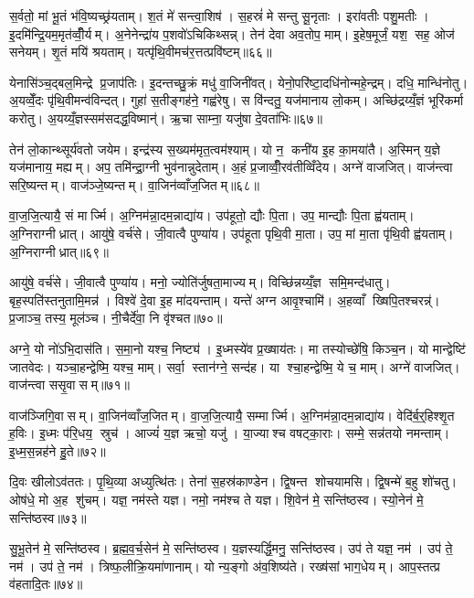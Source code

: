 स॒र्वतो॒ मां भू॒तं भ॑वि॒ष्यच्छ्र॑यताम्। श॒तं मे॑ सन्त्वा॒शिष॑। स॒हस्रं॑ मे सन्तु सू॒नृताः। इरा॑वतीः पशु॒मतीः। इ॒दमि॑न्द्रि॒यम॒मृत॑व्वीँ॒र्यम्। अ॒नेनेन्द्रा॑य प॒शवो॑ऽचिकिथ्सन्न्। तेन॑ देवा अव॒तोप॒ माम्। इ॒हेष॒मूर्जं॒ यश॒ सह॒ ओज॑ सनेयम्। शृ॒तं मयि॑ श्रयताम्। यत्पृ॑थि॒वीमच॑र॒त्तत्प्रवि॑ष्टम्॥६६॥

येनासि॑ञ्च॒द्बल॒मिन्द्रे प्र॒जाप॑तिः। इ॒दन्तच्छु॒क्रं मधु॑ वा॒जिनी॑वत्। येनो॒परि॑ष्टा॒दधि॑नोन्महे॒न्द्रम्। दधि॒ मान्धि॑नोतु। अ॒यव्वेँ॒दः पृ॑थि॒वीमन्व॑विन्दत्। गुहा॑ स॒तीङ्गह॑ने॒ गह्व॑रेषु। स वि॑न्दतु॒ यज॑मानाय लो॒कम्। अच्छि॑द्रय्यँ॒ज्ञं भूरि॑कर्मा करोतु। अ॒यय्यँ॒ज्ञस्सम॑सदद्ध॒विष्मान्॑। ऋ॒चा साम्ना॒ यजु॑षा दे॒वता॑भिः॥६७॥

तेन॑ लो॒कान्थ्सूर्य॑वतो जयेम। इन्द्र॑स्य स॒ख्यम॑मृत॒त्वम॑श्याम्। यो न॒ कनी॑य इ॒ह का॒मया॑तै। अ॒स्मिन् य॒ज्ञे यज॑मानाय॒ मह्यम्। अप॒ तमि॑न्द्रा॒ग्नी भुव॑नान्नुदेताम्। अ॒हं प्र॒जाव्वीँ॒रव॑तीव्विँदेय। अग्ने॑ वाजजित्। वाज॑न्त्वा सरि॒ष्यन्तम्। वाज॑ञ्जे॒ष्यन्तम्। वा॒जिन॑व्वाँज॒जितम्॥६८॥

वा॒ज॒जि॒त्यायै॒ सं मार्ज्मि। अ॒ग्निम॑न्ना॒दम॒न्नाद्या॑य। उप॑हूतो॒ द्यौः पि॒ता। उप॒ मान्द्यौः पि॒ता ह्व॑यताम्। अ॒ग्निराग्नीध्रात्। आयु॑षे॒ वर्च॑से। जी॒वात्वै पुण्या॑य। उप॑हूता पृथि॒वी मा॒ता। उप॒ मां मा॒ता पृ॑थि॒वी ह्व॑यताम्। अ॒ग्निराग्नीध्रात्॥६९॥

आयु॑षे॒ वर्च॑से। जी॒वात्वै पुण्या॑य। मनो॒ ज्योति॑र्जुषता॒माज्यम्। विच्छि॑न्नय्यँ॒ज्ञ समि॒मन्द॑धातु। बृह॒स्पति॑स्तनुतामि॒मन्न॑। विश्वे॑ दे॒वा इ॒ह मा॑दयन्ताम्। यन्ते॑ अग्न आवृ॒श्चामि॑। अ॒हव्वाँ ख्षिपि॒तश्चरन्न्॑। प्र॒जाञ्च॒ तस्य॒ मूल॑ञ्च। नी॒चैर्दे॑वा॒ नि वृ॑श्चत॥७०॥

अग्ने॒ यो नो॑ऽभि॒दास॑ति। स॒मा॒नो यश्च॒ निष्ट्य॑। इ॒ध्मस्ये॑व प्र॒ख्षाय॑तः। मा तस्योच्छे॑षि॒ किञ्च॒न। यो मान्द्वेष्टि॑ जातवेदः। यञ्चा॒हन्द्वेष्मि॒ यश्च॒ माम्। सर्वा॒ स्तान॑ग्ने॒ सन्द॑ह। या श्चा॒हन्द्वेष्मि॒ ये च॒ माम्। अग्ने॑ वाजजित्। वाज॑न्त्वा ससृ॒वासम्॥७१॥

वाज॑ञ्जिगि॒वासम्। वा॒जिन॑व्वाँज॒जितम्। वा॒ज॒जि॒त्यायै॒ सम्मार्ज्मि। अ॒ग्निम॑न्ना॒दम॒न्नाद्या॑य। वेदि॑र्ब॒र्॒हिश्शृ॒त ह॒विः। इ॒ध्मः प॑रि॒धय॒ स्रुच॑। आज्यं॑ य॒ज्ञ ऋचो॒ यजु॑। या॒ज्याश्च वषट्का॒राः। सम्मे॒ सन्न॑तयो नमन्ताम्। इ॒ध्म॒स॒न्नह॑ने हु॒ते॥७२॥

दि॒वः खीलोऽव॑ततः। पृ॒थि॒व्या अध्युत्थि॑तः। तेना॑ स॒हस्र॑काण्डेन। द्वि॒षन्त शोचयामसि। द्वि॒षन्मे॑ ब॒हु शो॑चतु। ओष॑धे॒ मो अ॒ह शु॑चम्। यज्ञ॒ नम॑स्ते यज्ञ। नमो॒ नम॑श्च ते यज्ञ। शि॒वेन॑ मे॒ सन्ति॑ष्ठस्व। स्यो॒नेन॑ मे॒ सन्ति॑ष्ठस्व॥७३॥

सु॒भू॒तेन॑ मे॒ सन्ति॑ष्ठस्व। ब्र॒ह्म॒व॒र्च॒सेन॑ मे॒ सन्ति॑ष्ठस्व। य॒ज्ञस्यर्द्धि॒मनु॒ सन्ति॑ष्ठस्व। उप॑ ते यज्ञ॒ नम॑। उप॑ ते॒ नम॑। उप॑ ते॒ नम॑। त्रिष्फ॒लीक्रि॒यमा॑णानाम्। यो न्य॒ङ्गो अ॑व॒शिष्य॑ते। रख्ष॑सां भाग॒धेयम्। आप॒स्तत्प्र व॑हतादि॒तः॥७४॥

